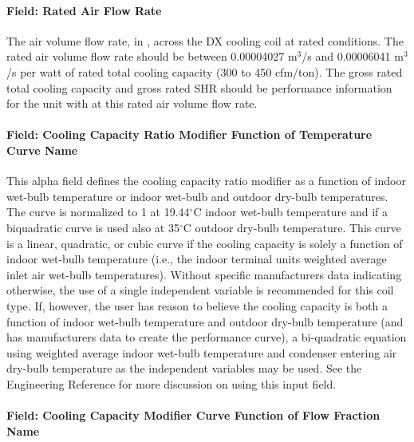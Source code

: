\paragraph{Field: Rated Air Flow Rate}\label{field-rated-air-flow-rate}

The air volume flow rate, in \si{\volumeFlowRate}, across the DX cooling coil at rated conditions. The rated air volume flow rate should be between 0.00004027 m\(^{3}\)/s and 0.00006041 m\(^{3}\)/s per watt of rated total cooling capacity (300 to 450 cfm/ton). The gross rated total cooling capacity and gross rated SHR should be performance information for the unit with at this rated air volume flow rate.

\paragraph{Field: Cooling Capacity Ratio Modifier Function of Temperature Curve Name}\label{field-cooling-capacity-ratio-modifier-function-of-temperature-curve-name}

This alpha field defines the cooling capacity ratio modifier as a function of indoor wet-bulb temperature or indoor wet-bulb and outdoor dry-bulb temperatures. The curve is normalized to 1 at 19.44$^\circ$C indoor wet-bulb temperature and if a biquadratic curve is used also at 35$^\circ$C outdoor dry-bulb temperature. This curve is a linear, quadratic, or cubic curve if the cooling capacity is solely a function of indoor wet-bulb temperature (i.e., the indoor terminal units weighted average inlet air wet-bulb temperatures). Without specific manufacturers data indicating otherwise, the use of a single independent variable is recommended for this coil type. If, however, the user has reason to believe the cooling capacity is both a function of indoor wet-bulb temperature and outdoor dry-bulb temperature (and has manufacturers data to create the performance curve), a bi-quadratic equation using weighted average indoor wet-bulb temperature and condenser entering air dry-bulb temperature as the independent variables may be used. See the Engineering Reference for more discussion on using this input field.

\paragraph{Field: Cooling Capacity Modifier Curve Function of Flow Fraction Name}\label{field-cooling-capacity-modifier-curve-function-of-flow-fraction-name}

